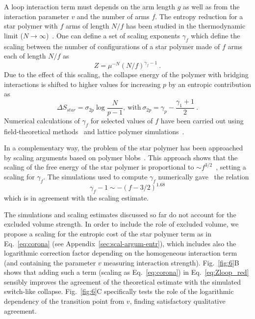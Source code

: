 \documentclass[
preprint,
a4paper,
12pt,
superscriptaddress,
pre]{revtex4}
\begin{document}
A loop interaction term must depends on the arm length $g$ as well as
from the interaction parameter $v$ and the number of arms $f$.  The
entropy reduction for a star polymer with $f$ arms of length $N/f$ has
been studied in the thermodynamic limit ($N \to
\infty$)~\cite{Schafer1992}. One can define a set of scaling exponents
$\gamma_f$ which define the scaling between the number of
configurations of a star polymer made of $f$ arms each of length $N/f$
as
\begin{equation}
  Z = \mu^{-N} \left(N/f\right)^{\gamma_f - 1} \ .
\end{equation}
Due to the effect of this scaling, the collapse energy of the polymer
with bridging interactions is shifted to higher values for increasing
$p$ by an entropic contribution as~\cite{Hanke2003}
\begin{equation}
\Delta S_{star} = \sigma_{2p} \log \frac{N}{p-1},\ 
\mathrm{with}\ \sigma_{2p} = \gamma_p - \frac{\gamma_1 + 1}{2} \ .
\label{eq:sstar}
\end{equation}
Numerical calculations of $\gamma_f$ for selected values of $f$ have
been carried out using field-theoretical methods~\cite{Schafer1992}
and lattice polymer
simulations~\cite{Batoulis1989,Grest1994,Caracciolo1998,Zifferer1999,Shida2000,
  Hsu2004}.

In a complementary way, the problem of the star polymer has been
approached by scaling arguments based on polymer
blobs~\cite{Daoud1982}. This approach shows that the scaling of the
free energy of the star polymer is proportional to $\sim
f^{3/2}$~\cite{Witten1986}, setting a scaling for $\gamma_f$. The
simulations used to compute $\gamma_f$ numerically gave~\cite{Hsu2004}
the relation
\begin{equation}
\gamma_f - 1 \sim -(f-3/2)^{1.68}
\label{eq:grass}
\end{equation}
which is in agreement with the scaling estimate.


The simulations and scaling estimates discussed so far do not account
for the excluded volume strength. In order to include the role of
excluded volume, we propose a scaling for the entropic cost of the
star polymer term as in Eq.~\ref{eq:corona} (see
Appendix~\ref{sec:scal-argum-entr}), which includes also the
logarithmic correction factor depending on the homogeneous interaction
term (and containing the parameter $v$ measuring interaction
strength).
%
Fig.~\ref{fig:6}B shows that adding such a term (scaling as
Eq.~\ref{eq:corona}) in Eq.~\ref{eq:Zloop_red} sensibly improves the
agreement of the theoretical estimate with the simulated switch-like
collapse.  Fig.~\ref{fig:6}C specifically tests the role of the
logarithmic dependency of the transition point from $v$, finding
satisfactory qualitative agreement.
\end{document}
